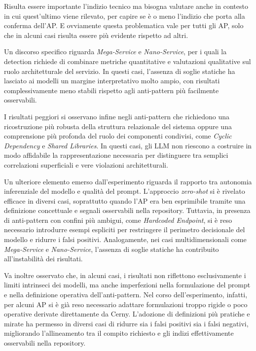Risulta essere importante l'indizio tecnico ma bisogna valutare anche in contesto in cui quest'ultimo viene rilevato, per capire se è o meno l'indizio che porta alla conferma dell'AP. E ovviamente questa problematica vale per tutti gli AP, solo che in alcuni casi risulta essere più evidente rispetto ad altri.

Un discorso specifico riguarda \textit{Mega-Service} e \textit{Nano-Service}, per i quali la detection richiede di combinare metriche quantitative e valutazioni qualitative sul ruolo architetturale del servizio. In questi casi, l’assenza di soglie statiche ha lasciato ai modelli un margine interpretativo molto ampio, con risultati complessivamente meno stabili rispetto agli anti-pattern più facilmente osservabili.

I risultati peggiori si osservano infine negli anti-pattern che richiedono una ricostruzione più robusta della struttura relazionale del sistema oppure una comprensione più profonda del ruolo dei componenti condivisi, come \textit{Cyclic Dependency} e \textit{Shared Libraries}. In questi casi, gli LLM non riescono a costruire in modo affidabile la rappresentazione necessaria per distinguere tra semplici correlazioni superficiali e vere violazioni architetturali.

Un ulteriore elemento emerso dall’esperimento riguarda il rapporto tra autonomia inferenziale del modello e qualità del prompt. L’approccio \textit{zero-shot} si è rivelato efficace in diversi casi, soprattutto quando l'AP era ben esprimibile tramite una definizione concettuale e segnali osservabili nella repository. Tuttavia, in presenza di anti-pattern con confini più ambigui, come \textit{Hardcoded Endpoint}, si è reso necessario introdurre esempi espliciti per restringere il perimetro decisionale del modello e ridurre i falsi positivi. Analogamente, nei casi multidimensionali come \textit{Mega-Service} e \textit{Nano-Service}, l’assenza di soglie statiche ha contribuito all’instabilità dei risultati.

Va inoltre osservato che, in alcuni casi, i risultati non riflettono esclusivamente i limiti intrinseci dei modelli, ma anche imperfezioni nella formulazione del prompt e nella definizione operativa dell’anti-pattern. Nel corso dell’esperimento, infatti, per alcuni AP si è già reso necessario adattare formulazioni troppo rigide o poco operative derivate direttamente da Cerny. L’adozione di definizioni più pratiche e mirate ha permesso in diversi casi di ridurre sia i falsi positivi sia i falsi negativi, migliorando l’allineamento tra il compito richiesto e gli indizi effettivamente osservabili nella repository.

